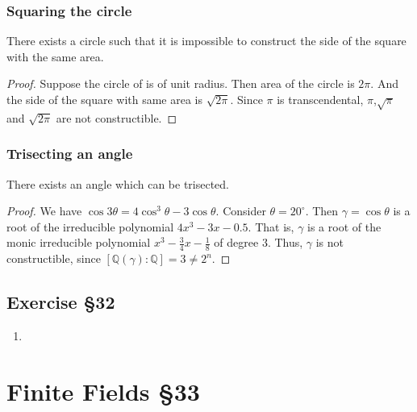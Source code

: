 \subsubsection{Squaring the circle}
\begin{theorem}
	There exists a circle such that it is impossible to construct the side of the square with the same area.
\end{theorem}
\begin{proof}
	Suppose the circle of is of unit radius.
	Then area of the circle is $2\pi$.
	And the side of the square with same area is $\sqrt{2\pi}$.
	Since $\pi$ is transcendental, $\pi$,$\sqrt{\pi}$ and $\sqrt{2\pi}$ are not constructible.
\end{proof}
\subsubsection{Trisecting an angle}
\begin{theorem}
	There exists an angle which can be trisected.
\end{theorem}
\begin{proof}
	We have $\cos 3\theta = 4\cos^3 \theta - 3\cos \theta$.
	Consider $\theta = 20^\circ$.
	Then $\gamma = \cos \theta$ is a root of the irreducible polynomial $4x^3-3x-0.5$.
	That is, $\gamma$ is a root of the monic irreducible polynomial $x^3-\frac{3}{4}x-\frac{1}{8}$ of degree $3$.
	Thus, $\gamma$ is not constructible, since $[\mathbb{Q}(\gamma) : \mathbb{Q}] = 3 \ne 2^n$.
\end{proof}
\subsection{Exercise \S32}
\begin{enumerate}
	\item
\end{enumerate}

\section{Finite Fields \S33}
